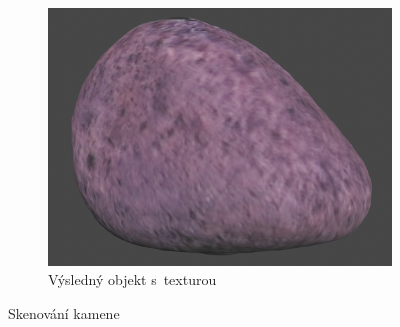 \documentclass[12pt]{report}			%
\begin{document}
\begin{figure}[h]
\begin{subfigure}[b]{0.3\textwidth}
                    \end{subfigure}
                    \hfill
                    \begin{subfigure}[b]{0.3\textwidth}
                        \centering
                        \includegraphics[width=\textwidth]{images/kamenObrazBarevny.png}
                        \caption{Výsledný objekt s~texturou}
                    \end{subfigure}
                    \caption{Skenování kamene}
                \end{figure}
\end{document}
